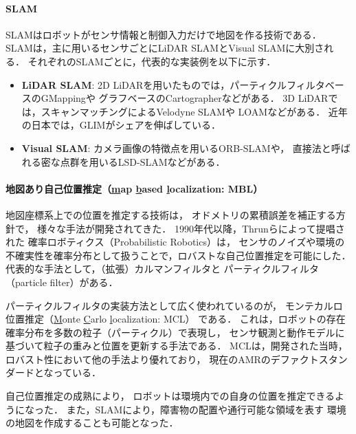 \paragraph{SLAM}
SLAMはロボットがセンサ情報と制御入力だけで地図を作る技術である\cite{Thrun2005}．
SLAMは，主に用いるセンサごとにLiDAR SLAMとVisual SLAMに大別される．
それぞれのSLAMごとに，代表的な実装例を以下に示す\cite{友納2020}．
\begin{itemize}
    \item \textbf{LiDAR SLAM}: 
	2D LiDARを用いたものでは，パーティクルフィルタベースのGMapping\cite{Brain2009gmapping}や
	グラフベースのCartographer\cite{Damon2016cartographer}などがある．
	3D LiDARでは，スキャンマッチングによるVelodyne SLAM\cite{Moosmann2011}や
	LOAM\cite{Zhang2014}などがある．
	近年の日本では，GLIM\cite{koide2024}がシェアを伸ばしている\cite{原2025}．
    \item \textbf{Visual SLAM}: 
	カメラ画像の特徴点を用いるORB-SLAM\cite{Raul2015}や，
	直接法と呼ばれる密な点群を用いるLSD-SLAM\cite{Engel2014}などがある．
\end{itemize}

\paragraph{地図あり自己位置推定（\underline{m}ap \underline{b}ased \underline{l}ocalization: MBL）}
地図座標系上での位置を推定する技術は，
オドメトリの累積誤差を補正する方針で，
様々な手法が開発されてきた．
1990年代以降，Thrunらによって提唱された
確率ロボティクス（Probabilistic Robotics）\cite{Thrun2005}は，
センサのノイズや環境の不確実性を確率分布として扱うことで，ロバストな自己位置推定を可能にした．
代表的な手法として，（拡張）カルマンフィルタと
パーティクルフィルタ（particle filter）がある．

パーティクルフィルタの実装方法として広く使われているのが，
モンテカルロ位置推定（\underline{M}onte \underline{C}arlo \underline{l}ocalization: MCL）\cite{Fox1999}
である．
これは，ロボットの存在確率分布を多数の粒子（パーティクル）で表現し，
センサ観測と動作モデルに基づいて粒子の重みと位置を更新する手法である．
MCLは，開発された当時，ロバスト性において他の手法より優れており，
現在のAMRのデファクトスタンダードとなっている．

\phantom{00}

自己位置推定の成熟により，
ロボットは環境内での自身の位置を推定できるようになった．
また，SLAMにより，障害物の配置や通行可能な領域を表す
環境の地図を作成することも可能となった．


